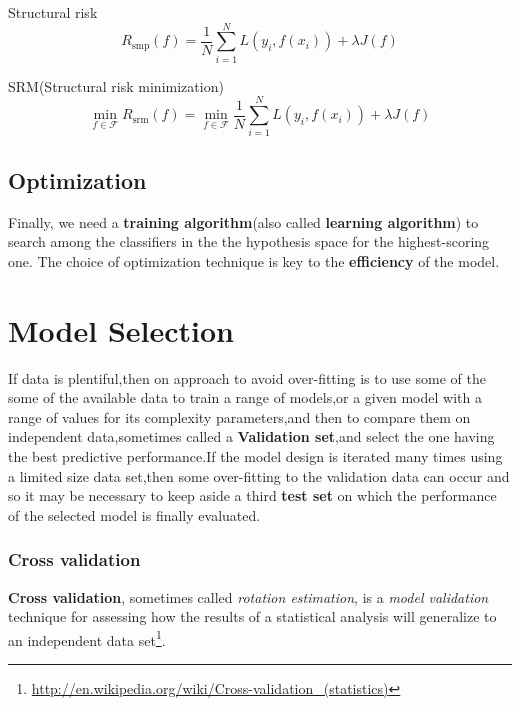 \begin{definition}
Structural risk
\begin{equation}
R_{\mathrm{smp}}(f)=\dfrac{1}{N}\sum\limits_{i=1}^{N} L\left(y_i,f(x_i)\right) +\lambda J(f)
\end{equation}
\end{definition}

\begin{definition}
SRM(Structural risk minimization)
\begin{equation}
\min\limits _{f \in \mathcal{F}} R_{\mathrm{srm}}(f)=\min\limits _{f \in \mathcal{F}} \dfrac{1}{N}\sum\limits_{i=1}^{N} L\left(y_i,f(x_i)\right) +\lambda J(f)
\end{equation}
\end{definition}


\subsection{Optimization}
Finally, we need a \textbf{training algorithm}(also called \textbf{learning algorithm}) to search among the classifiers in the the hypothesis space for the highest-scoring one. The choice of optimization technique is key to the \textbf{efficiency} of the model.

\section{Model Selection}
If data is plentiful,then on approach to avoid over-fitting is to use some of the some of the available data to train a range of models,or a given model with a range of values for its complexity parameters,and then to compare them on independent data,sometimes called a \textbf{Validation set},and select the one having the best predictive performance.If the model design is iterated many times using a limited size data set,then some over-fitting to the validation data can occur and so it may be necessary to keep aside a third \textbf{test set} on which the performance of the selected model is finally evaluated.

\subsubsection{Cross validation}
\label{sec:Cross-validation}
\begin{definition}
	\textbf{Cross validation}, sometimes called \emph{rotation estimation}, is a \emph{model validation} technique for assessing how the results of a statistical analysis will generalize to an independent data set\footnote{\url{http://en.wikipedia.org/wiki/Cross-validation_(statistics)}}.
\end{definition}

